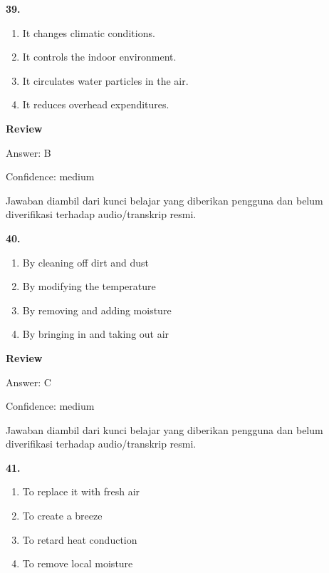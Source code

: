 \documentclass[12pt]{article}
\begin{document}
\noindent\textbf{39.}
\begin{enumerate}[label=(\Alph*),leftmargin=*,itemsep=0.2em]
\item It changes climatic conditions.
\item It controls the indoor environment.
\item It circulates water particles in the air.
\item It reduces overhead expenditures.
\end{enumerate}
\par
\begingroup
\setlength{\parskip}{0pt}
\setlength{\parindent}{0pt}
\textbf{Review}\par
Answer: B\par
Confidence: medium\par
Jawaban diambil dari kunci belajar yang diberikan pengguna dan belum diverifikasi terhadap audio/transkrip resmi.\par
\endgroup
\par
\vspace{0.25\baselineskip}
\noindent\textbf{40.}
\begin{enumerate}[label=(\Alph*),leftmargin=*,itemsep=0.2em]
\item By cleaning off dirt and dust
\item By modifying the temperature
\item By removing and adding moisture
\item By bringing in and taking out air
\end{enumerate}
\par
\begingroup
\setlength{\parskip}{0pt}
\setlength{\parindent}{0pt}
\textbf{Review}\par
Answer: C\par
Confidence: medium\par
Jawaban diambil dari kunci belajar yang diberikan pengguna dan belum diverifikasi terhadap audio/transkrip resmi.\par
\endgroup
\par
\vspace{0.25\baselineskip}
\noindent\textbf{41.}
\begin{enumerate}[label=(\Alph*),leftmargin=*,itemsep=0.2em]
\item To replace it with fresh air
\item To create a breeze
\item To retard heat conduction
\item To remove local moisture
\end{enumerate}
\par
\end{document}
